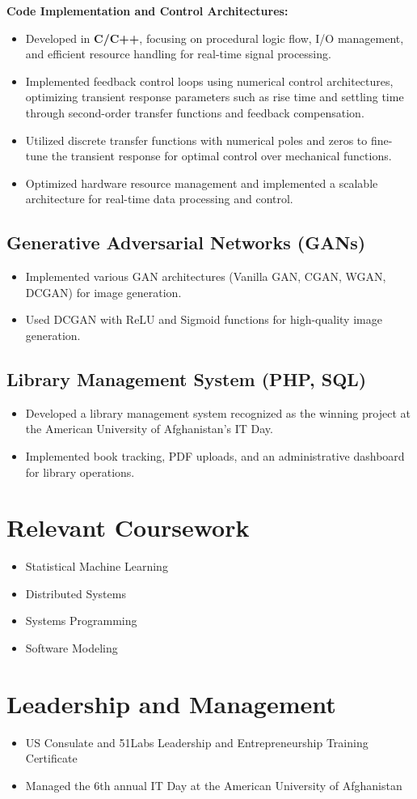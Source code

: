 \documentclass[a4paper,10pt]{article}
\begin{document}
\textbf{Code Implementation and Control Architectures:}
\begin{itemize}
    \item Developed in \textbf{C/C++}, focusing on procedural logic flow, I/O management, and efficient resource handling for real-time signal processing.
    \item Implemented feedback control loops using numerical control architectures, optimizing transient response parameters such as rise time and settling time through second-order transfer functions and feedback compensation.
    \item Utilized discrete transfer functions with numerical poles and zeros to fine-tune the transient response for optimal control over mechanical functions.
    \item Optimized hardware resource management and implemented a scalable architecture for real-time data processing and control.
\end{itemize}

\subsection*{Generative Adversarial Networks (GANs)}
\begin{itemize}
    \item Implemented various GAN architectures (Vanilla GAN, CGAN, WGAN, DCGAN) for image generation.
    \item Used DCGAN with ReLU and Sigmoid functions for high-quality image generation.
\end{itemize}

\subsection*{Library Management System (PHP, SQL)}
\begin{itemize}
    \item Developed a library management system recognized as the winning project at the American University of Afghanistan's IT Day.
    \item Implemented book tracking, PDF uploads, and an administrative dashboard for library operations.
\end{itemize}

\section{Relevant Coursework}
\begin{multicols}{2}
    \begin{itemize}
        \item Statistical Machine Learning
        \item Distributed Systems
        \item Systems Programming
        \item Software Modeling
    \end{itemize}
\end{multicols}

\section{Leadership and Management}
\begin{itemize}
    \item US Consulate and 51Labs Leadership and Entrepreneurship Training Certificate
    \item Managed the 6th annual IT Day at the American University of Afghanistan
\end{itemize}
\end{document}
